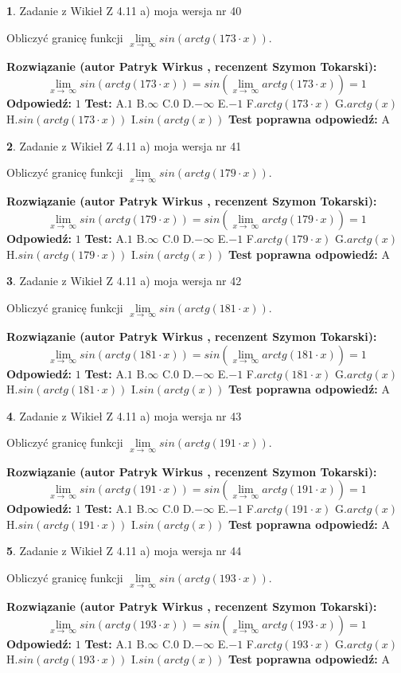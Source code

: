\documentclass[12pt, a4paper]{article}
\theoremstyle{definition} %
\newtheorem{zad}{}
\newcommand{\zadStart}[1]{\begin{zad}#1\newline}
\newcommand{\zadStop}{\end{zad}}
\newcommand{\rozwStart}[2]{\noindent \textbf{Rozwiązanie (autor #1 , recenzent #2): }\newline}
\newcommand{\rozwStop}{\newline}
\newcommand{\odpStart}{\noindent \textbf{Odpowiedź:}\newline}
\newcommand{\odpStop}{\newline}
\newcommand{\testStart}{\noindent \textbf{Test:}\newline}
\newcommand{\testStop}{\newline}
\newcommand{\kluczStart}{\noindent \textbf{Test poprawna odpowiedź:}\newline}
\newcommand{\kluczStop}{\newline}
\begin{document}
\zadStart{Zadanie z Wikieł Z 4.11 a) moja wersja nr 40}

Obliczyć granicę funkcji  $\lim\limits_{x\to\ \infty}sin(arctg(173\cdot x))$.
\zadStop
\rozwStart{Patryk Wirkus}{Szymon Tokarski}
$$\lim\limits_{x\to\ \infty}sin(arctg(173\cdot x)) = sin(\lim\limits_{x\to\ \infty}arctg(173\cdot x)) = 1$$
\rozwStop
\odpStart
$1$
\odpStop
\testStart
A.$1$ B.$\infty$ C.$0$ D.$-\infty$ E.$-1$
F.$arctg(173\cdot x)$ G.$arctg(x)$
H.$sin(arctg(173\cdot x))$
I.$sin(arctg(x))$
\testStop
\kluczStart
A
\kluczStop



\zadStart{Zadanie z Wikieł Z 4.11 a) moja wersja nr 41}

Obliczyć granicę funkcji  $\lim\limits_{x\to\ \infty}sin(arctg(179\cdot x))$.
\zadStop
\rozwStart{Patryk Wirkus}{Szymon Tokarski}
$$\lim\limits_{x\to\ \infty}sin(arctg(179\cdot x)) = sin(\lim\limits_{x\to\ \infty}arctg(179\cdot x)) = 1$$
\rozwStop
\odpStart
$1$
\odpStop
\testStart
A.$1$ B.$\infty$ C.$0$ D.$-\infty$ E.$-1$
F.$arctg(179\cdot x)$ G.$arctg(x)$
H.$sin(arctg(179\cdot x))$
I.$sin(arctg(x))$
\testStop
\kluczStart
A
\kluczStop



\zadStart{Zadanie z Wikieł Z 4.11 a) moja wersja nr 42}

Obliczyć granicę funkcji  $\lim\limits_{x\to\ \infty}sin(arctg(181\cdot x))$.
\zadStop
\rozwStart{Patryk Wirkus}{Szymon Tokarski}
$$\lim\limits_{x\to\ \infty}sin(arctg(181\cdot x)) = sin(\lim\limits_{x\to\ \infty}arctg(181\cdot x)) = 1$$
\rozwStop
\odpStart
$1$
\odpStop
\testStart
A.$1$ B.$\infty$ C.$0$ D.$-\infty$ E.$-1$
F.$arctg(181\cdot x)$ G.$arctg(x)$
H.$sin(arctg(181\cdot x))$
I.$sin(arctg(x))$
\testStop
\kluczStart
A
\kluczStop



\zadStart{Zadanie z Wikieł Z 4.11 a) moja wersja nr 43}

Obliczyć granicę funkcji  $\lim\limits_{x\to\ \infty}sin(arctg(191\cdot x))$.
\zadStop
\rozwStart{Patryk Wirkus}{Szymon Tokarski}
$$\lim\limits_{x\to\ \infty}sin(arctg(191\cdot x)) = sin(\lim\limits_{x\to\ \infty}arctg(191\cdot x)) = 1$$
\rozwStop
\odpStart
$1$
\odpStop
\testStart
A.$1$ B.$\infty$ C.$0$ D.$-\infty$ E.$-1$
F.$arctg(191\cdot x)$ G.$arctg(x)$
H.$sin(arctg(191\cdot x))$
I.$sin(arctg(x))$
\testStop
\kluczStart
A
\kluczStop



\zadStart{Zadanie z Wikieł Z 4.11 a) moja wersja nr 44}

Obliczyć granicę funkcji  $\lim\limits_{x\to\ \infty}sin(arctg(193\cdot x))$.
\zadStop
\rozwStart{Patryk Wirkus}{Szymon Tokarski}
$$\lim\limits_{x\to\ \infty}sin(arctg(193\cdot x)) = sin(\lim\limits_{x\to\ \infty}arctg(193\cdot x)) = 1$$
\rozwStop
\odpStart
$1$
\odpStop
\testStart
A.$1$ B.$\infty$ C.$0$ D.$-\infty$ E.$-1$
F.$arctg(193\cdot x)$ G.$arctg(x)$
H.$sin(arctg(193\cdot x))$
I.$sin(arctg(x))$
\testStop
\kluczStart
A
\kluczStop
\end{document}
